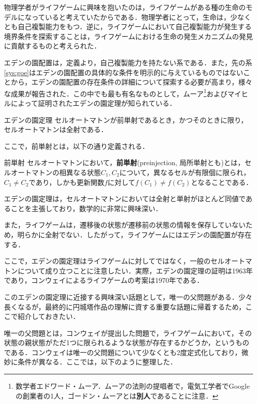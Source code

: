 \documentclass[10pt, a5paper, twoside]{ltjsarticle}
\begin{document}
            物理学者がライフゲームに興味を抱いたのは，ライフゲームがある種の生命のモデルになっていると考えていたからである．物理学者にとって，生命は，少なくとも自己複製能力をもつ．逆に，ライフゲームにおいて自己複製能力が発生する境界条件を探索することは，ライフゲームにおける生命の発生メカニズムの発見に貢献するものと考えられた．

            エデンの園配置は，定義より，自己複製能力を持たない系である．また，先の系\ref{sys:goe}はエデンの園配置の具体的な条件を明示的に与えているものではないことから，エデンの園配置の存在条件の詳細について探索する必要が高まり，様々な成果が報告された．この中でも最も有名なものとして，ムーア\footnote{数学者エドワード・ムーア．ムーアの法則の提唱者で，電気工学者でGoogleの創業者の1人，ゴードン・ムーアとは\textbf{別人}であることに注意．}およびマイヒルによって証明されたエデンの園定理が知られている\cite{moore, myhill}．

            \begin{thm}{エデンの園定理}{}
                セルオートマトンが前単射であるとき，かつそのときに限り，セルオートマトンは全射である．
            \end{thm}

            ここで，前単射とは，以下の通り定義される．

            \begin{dfn}{前単射}{}
                セルオートマトンにおいて，\textbf{前単射}(preinjection, 局所単射とも)とは，セルオートマトンの相異なる状態$C_1, C_2$について，異なるセルが有限個に限られ，$C_1 \neq C_2$であり，しかも更新関数$f$に対して$f(C_1) \neq f(C_2)$となることである．
            \end{dfn}

            エデンの園定理は，セルオートマトンにおいては全射と単射がほとんど同値であることを主張しており，数学的に非常に興味深い．

            また，ライフゲームは，遷移後の状態が遷移前の状態の情報を保存していないため，明らかに全射でない．したがって，ライフゲームにはエデンの園配置が存在する．

            ここで，エデンの園定理はライフゲームに対してではなく，一般のセルオートマトンについて成り立つことに注意したい．実際，エデンの園定理の証明は1963年であり，コンウェイによるライフゲームの考案は1970年である．

            このエデンの園定理に近接する興味深い話題として，唯一の父問題がある．少々長くなるが，最終的に円城塔作品の理解に資する重要な話題に帰着するため，ここで紹介しておきたい．

            唯一の父問題とは，コンウェイが提出した問題で，ライフゲームにおいて，その状態の親状態がただ1つに限られるような状態が存在するかどうか，というものである．コンウェイは唯一の父問題について少なくとも2度定式化しており，微妙に条件が異なる\cite{apgoucher}．ここでは，以下のように整理した．
\end{document}
